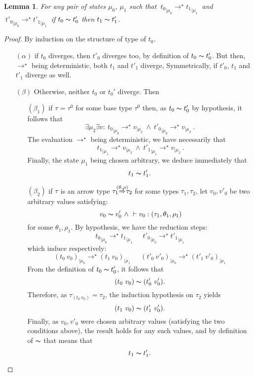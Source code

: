 \documentclass[a4paper,12pt,oneside]{report}
\theoremstyle{plain}
\newtheorem{lemma}[definition]{Lemma}
\newcommand{\tmapp}[2]{(#1 ~ #2)}
\newcommand{\ty}[1]{\tau_{#1}}
\newcommand{\tyarr}[3]
{\tau_{#1}\hspace*{-0.2cm}\stackrel{#3}{\Rightarrow}\hspace*{-0.2cm}\tau_{#2}}
\newcommand{\typerule}[5]{~\vdash  #1 : (#2, #3, #4) #5}
\newcommand{\evalstar}[4]{~#1_{|\mu_#2} \rightarrow^{\star} #3_{|\mu_#4} ~}
\newcommand{\eqv}[2]{#1 \thicksim #2}
\begin{document}
	\begin{lemma}
		For any pair of states $\mu_0$, $\mu_1$ such that
		$\evalstar{{t_0}}{0}{{t_1}}{1}$ and $\evalstar{{t'_0}}{0}{{t'_1}}{1}$
		if $\eqv{t_0}{t'_0}$ then $\eqv{t_1}{t'_1}$.
	\end{lemma}
	
	\begin{proof}
		By induction on the structure of type of $t_0$.
		\begin{itemize}
			\item[$(\alpha)$] if $t_0$ diverges, then $t'_0$ diverges too,
				by definition of $\eqv{t_0}{t'_0}$. 
				But then, $\rightarrow^\star$ being deterministic, both $t_1$ and $t'_1$
				diverge, Symmetrically, if $t'_0$, $t_1$ and $t'_1$ diverge as well.
			
			\item[$(\beta)$] Otherwise, neither $t_0$ or $t_{0}'$ diverge. Then
			\begin{itemize}
				\item[$(\beta_1)$] 
				if $\ty{} = \ty{}^0$ for some base type $\ty{}^0$ 
				then, as $\eqv{t_0}{t'_0}$ by hypothesis, it follows that 
					$$ \exists \mu_2 \exists v: 
					\evalstar{{t_0}}{0}{v}{2} \wedge \evalstar{{t'_0}}{0}{v}{2}.$$
				The evaluation $\rightarrow^\star$ being deterministic, 
				we have necessarily that
					$$\evalstar{{t_1}}{1}{v}{2} \wedge \evalstar{{t'_1}}{1}{v}{2}.$$
				Finally, the state $\mu_1$ being chosen arbitrary, we deduce 
				immediately that $$\eqv{t_1}{t'_1}.$$				
			
			
				\item[$(\beta_2)$] 
				if $\ty{}$ is an arrow type $\tyarr{1}{2}{(\theta,\rho)}$ for some types 
				$\ty{1}, \ty{2}$,	let $v_0, v'_0$ be two arbitrary values satisfying:
				  $$~\eqv{v_0}{v'_0}~\wedge \typerule{v_0}{\ty{1}}{\theta_1}{\rho_1}{}$$
				for some $\theta_1, \rho_1$.
				By hypothesis, we have the reduction steps:
					$$\evalstar{{t_0}}{0}{{t_1}}{1}\quad\evalstar{{t'_0}}{0}{{t'_1}}{1}$$						which induce respectively: 
					$$\evalstar{\tmapp{t_0}{v_0}}{0}{\tmapp{t_1}{v_0}}{1} \quad
						\evalstar{\tmapp{t'_0}{v'_0}}{0}{\tmapp{t'_1}{v'_0}}{1}$$	
				From the definition of $\eqv{t_0}{t'_0}$, it follows that
					$$ \eqv{\tmapp{t_0}{v_0}}{\tmapp{t'_0}{v'_0}}.$$
				Therefore, as $\tau_{\tmapp{t_0}{v_0}} = \tau_2$, the
				induction hypothesis on $\tau_2$ yields 
					$$ \eqv{\tmapp{t_1}{v_0}}{\tmapp{t'_1}{v'_0}}.$$
				Finally, as $v_0, v'_0$ were chosen arbitrary values (satisfying the
				 two conditions above), the result holds for any such values, and by
				 definition of $\thicksim$ that means that $$\eqv{t_1}{t'_1}.$$		
			\end{itemize}
		\end{itemize}
	\end{proof}		
\end{document}
